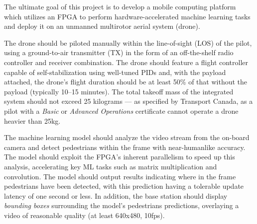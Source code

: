 The ultimate goal of this project is to develop a mobile computing platform which utilizes an FPGA to perform hardware-accelerated machine learning tasks and deploy it on an unmanned multirotor aerial system (drone). 

The drone should be piloted manually within the line-of-sight (LOS) of the pilot, using a ground-to-air transmitter (TX) in the form of an off-the-shelf radio controller and receiver combination. The drone should feature a flight controller capable of self-stabilization using well-tuned PIDs and,
with the payload attached, the drone's flight duration should be at least 50\% of that without the payload (typically 10--15 minutes).
The total takeoff mass of the integrated system should not exceed 25 kilograms --- as specified by Transport Canada, as a pilot with a \textit{Basic} or \textit{Advanced Operations} certificate cannot operate a drone heavier than 25kg.

The machine learning model should analyze the video stream from the on-board camera and detect pedestrians within the frame with near-humanlike accuracy. The model should exploit the FPGA's inherent parallelism to speed up this analysis, accelerating key ML tasks such as matrix multiplication and convolution. The model should output results indicating where in the frame pedestrians have been detected, with this prediction having a tolerable update latency of one second or less. In addition, the base station should display \textit{bounding boxes} surrounding the model's pedestrians predictions, overlaying a video of reasonable quality (at least 640x480, 10fps). 
